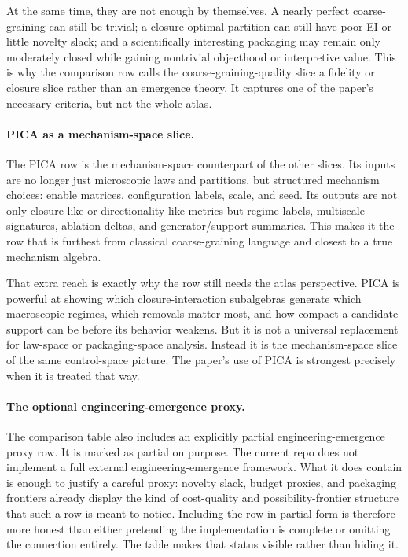 \documentclass[11pt]{article}
\theoremstyle{definition}
\begin{document}
At the same time, they are not enough by themselves. A nearly perfect coarse-graining can still be trivial; a closure-optimal partition can still have poor EI or little novelty slack; and a scientifically interesting packaging may remain only moderately closed while gaining nontrivial objecthood or interpretive value. This is why the comparison row calls the coarse-graining-quality slice a fidelity or closure slice rather than an emergence theory. It captures one of the paper's necessary criteria, but not the whole atlas.

\paragraph{PICA as a mechanism-space slice.}
The PICA row is the mechanism-space counterpart of the other slices. Its inputs are no longer just microscopic laws and partitions, but structured mechanism choices: enable matrices, configuration labels, scale, and seed. Its outputs are not only closure-like or directionality-like metrics but regime labels, multiscale signatures, ablation deltas, and generator/support summaries. This makes it the row that is furthest from classical coarse-graining language and closest to a true mechanism algebra.

That extra reach is exactly why the row still needs the atlas perspective. PICA is powerful at showing which closure-interaction subalgebras generate which macroscopic regimes, which removals matter most, and how compact a candidate support can be before its behavior weakens. But it is not a universal replacement for law-space or packaging-space analysis. Instead it is the mechanism-space slice of the same control-space picture. The paper's use of PICA is strongest precisely when it is treated that way.

\paragraph{The optional engineering-emergence proxy.}
The comparison table also includes an explicitly partial engineering-emergence proxy row. It is marked as partial on purpose. The current repo does not implement a full external engineering-emergence framework. What it does contain is enough to justify a careful proxy: novelty slack, budget proxies, and packaging frontiers already display the kind of cost-quality and possibility-frontier structure that such a row is meant to notice. Including the row in partial form is therefore more honest than either pretending the implementation is complete or omitting the connection entirely. The table makes that status visible rather than hiding it.
\end{document}
